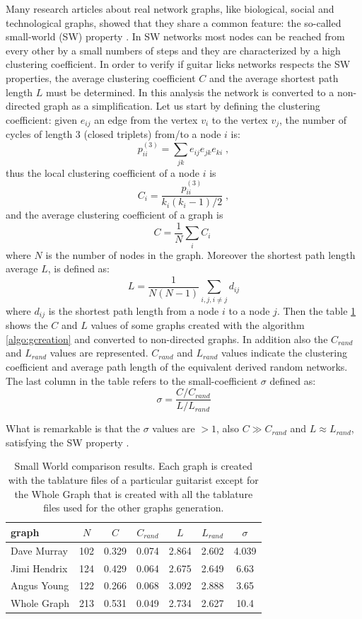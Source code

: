 \documentclass{llncs}
\begin{document}
Many research articles about real network graphs, like biological, 
social and technological graphs, showed that they share a common
feature: the so-called small-world (SW) property \cite{sw-watts}.
In SW networks most nodes can be reached from every other by a small
numbers of steps and they are characterized by a high
clustering coefficient. In order to verify if guitar
licks networks respects the SW properties, the average clustering coefficient $C$ and the
average shortest path length $L$ must be determined\cite{sw-ubiquity}. In this analysis
the network is converted to a non-directed graph as a simplification. Let us start by defining 
the clustering coefficient: given $e_{ij}$ an edge from the vertex $v_i$
to the vertex $v_j$, the number of cycles of length 3 (closed triplets) from/to a node $i$ is:
\[ p_{ii}^{(3)} = \sum_{jk}{e_{ij}e_{jk}e_{ki}}\;, \]
thus the local clustering coefficient of a node $i$ is 
\[ C_i = \frac{p_{ii}^{(3)}}{k_i(k_i-1)/2} \; ,\]
and the average clustering coefficient of a graph is
\[ C = \frac{1}{N} \sum_{i}{C_i} \;  \]
where $N$ is the number of nodes in the graph.
Moreover the shortest path length average $L$, is defined as:
\[ L = \frac{1}{N(N - 1)} \sum_{i,j,i \neq j}{d_{ij}} \]
where $d_{ij}$ is the shortest path length from a node $i$ to a node
$j$.
Then the table \ref{tab:sw} shows the $C$ and $L$ values of some graphs created with the algorithm
\ref{algo:gcreation} and converted to non-directed graphs. In addition
also the $C_{rand}$
and $L_{rand}$ values are represented. $C_{rand}$ and $L_{rand}$ values
indicate the clustering coefficient and average path length of the equivalent
derived random networks. The last column in the table refers to the small-coefficient $\sigma$ defined as:
\[ \sigma = \frac{C / C_{rand}}{L / L_{rand}} \]

What is remarkable is that the $\sigma$ values are $> 1$, also $C \gg
C_{rand}$ and $L \approx L_{rand}$, satisfying the SW property
\cite{sw-ubiquity}.
\setlength{\tabcolsep}{8pt}
\begin{table}
\begin{center}
  \begin{tabular}{ l c c c c c c  }
    \hline
    graph  & $N$ & $C$ & $C_{rand}$ & $L$ & $L_{rand}$ & $\sigma$ \\ \hline
    Dave Murray & 102 & 0.329 & 0.074 & 2.864 & 2.602 & 4.039 \\
	Jimi Hendrix & 124 & 0.429 & 0.064 & 2.675 & 2.649 & 6.63 \\
	Angus Young & 122 & 0.266 & 0.068 & 3.092 & 2.888 & 3.65 \\ 
	Whole Graph & 213 & 0.531 & 0.049 & 2.734 & 2.627 & 10.4 \\
    \hline
  \end{tabular}
\end{center}
  \caption{Small World comparison results. Each graph is created with
the tablature files of a particular guitarist except for the Whole Graph
that is created with all the tablature files used for the other graphs
generation.}
  \label{tab:sw}
\end{table}
 
\end{document}
